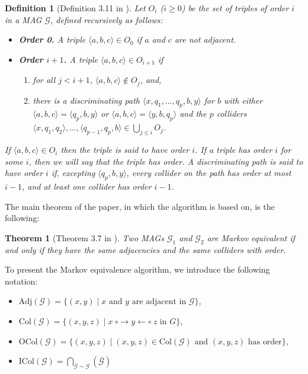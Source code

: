 \documentclass[a4paper]{article}
\newtheorem{definition}{Definition}
\newtheorem{theorem}{Theorem}
\begin{document}
\begin{definition}[Definition 3.11 in \cite{ali2009}] Let \( O_i \) (\( i \geq 0 \)) be the set of triples of order \( i \) in a MAG \( \mathcal{G} \), defined recursively as follows:
	\begin{itemize}
		\item  \textbf{Order 0.} A triple \( \langle a, b, c \rangle \in O_0 \) if \( a \) and \( c \) are not adjacent.
		\item \textbf{Order \( i+1 \).} A triple \( \langle a, b, c \rangle \in O_{i+1} \) if
		\begin{enumerate}
			\item for all \( j<i+1 \), \( \langle a, b, c \rangle \notin O_j \), and,
			\item there is a discriminating path \( \langle x, q_1, \ldots, q_p, b, y \rangle \) for \( b \) with either \( \langle a, b, c \rangle = \langle q_p, b, y \rangle \) or \( \langle a, b, c \rangle = \langle y, b, q_p \rangle \) and the \( p \) colliders \(\displaystyle \langle x, q_1, q_2 \rangle, \ldots, \langle q_{p-1}, q_p, b \rangle \in \bigcup_{j\leq i} O_j \).
		\end{enumerate}
	\end{itemize}

If \( \langle a, b, c \rangle \in O_i \) then the triple is said to have order \( i \). If a triple has order \( i \) for some \( i \), then we will say that the triple has order. A discriminating path is said to have order \( i \) if, excepting \( \langle q_p, b, y \rangle \), every collider on the path has order at most \( i - 1 \), and at least one collider has order \( i - 1 \).
\end{definition}

The main theorem of the paper, in which the algorithm is based on, is the following:

\begin{theorem}[Theorem 3.7 in \cite{ali2009}]Two MAGs $\mathcal{G}_1$ and $\mathcal{G}_2$ are Markov equivalent if and only if they have the same adjacencies and the same colliders with order.
\end{theorem}

To present the Markov equivalence algorithm, we introduce the following notation:

\begin{itemize}
	\item $\text{Adj}(\mathcal{G}) = \{(x, y) \mid x \text{ and } y \text{ are adjacent in } \mathcal{G}\}$,
	\item $\text{Col}(\mathcal{G}) = \{(x, y, z) \mid x ~\circ\rightarrow y \leftarrow\circ ~z \text{ in } G\}$,
	\item $\text{OCol}(\mathcal{G}) = \{(x, y, z) \mid (x, y, z) \in \text{Col}(\mathcal{G}) \text{ and } (x, y, z) \text{ has order}\}$,
	\item $\displaystyle \text{ICol}(\mathcal{G}) = \bigcap_{\overline{\mathcal{G}} \sim \mathcal{G}}(\overline{\mathcal{G}})$
\end{itemize}
\end{document}

